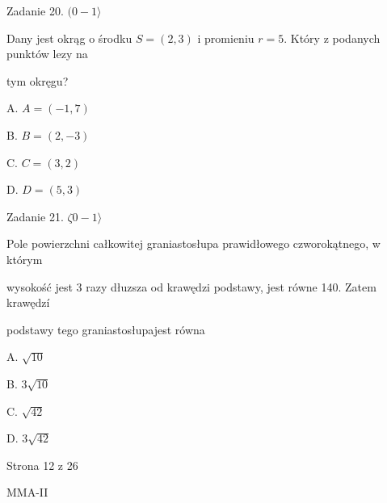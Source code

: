 \documentclass[a4paper,12pt]{article}
\begin{document}
Zadanie 20. $(0-1\rangle$

Dany jest okrąg o środku $S=(2,3)$ i promieniu $r=5$. Który z podanych punktów lezy na

tym okręgu?

A. $A=(-1,7)$

B. $B=(2,-3)$

C. $C=(3,2)$

D. $D=(5,3)$

Zadanie 21. $\zeta 0-1\rangle$

Pole powierzchni całkowitej graniastosłupa prawidłowego czworokątnego, w którym

wysokość jest 3 razy dłuzsza od krawędzi podstawy, jest równe 140. Zatem krawędzí

podstawy tego graniastosłupajest równa

A. $\sqrt{10}$

B. $3\sqrt{10}$

C. $\sqrt{42}$

D. $3\sqrt{42}$

Strona 12 z 26

MMA-II
\end{document}
